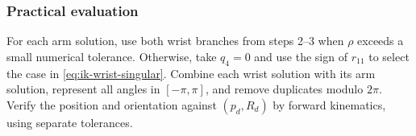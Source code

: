 \subsubsection*{Practical evaluation}

For each arm solution, use both wrist branches from steps 2--3 when $\rho$
exceeds a small numerical tolerance. Otherwise, take $q_4=0$ and use the sign
of $r_{11}$ to select the case in \eqref{eq:ik-wrist-singular}.
Combine each wrist solution with its arm solution, represent all angles in
$[-\pi,\pi]$, and remove duplicates modulo $2\pi$. Verify the position and
orientation against $(p_d,R_d)$ by forward kinematics, using separate tolerances.
